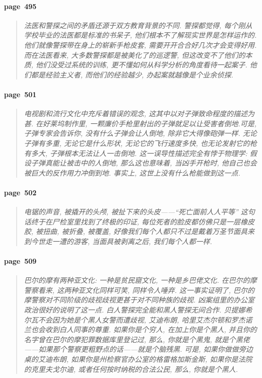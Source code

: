 \paragraph*{page~495}
\begin{quotation}
    \itshape
    法医和警探之间的矛盾还源于双方教育背景的不同. 警探都觉得, 每个刚从学校毕业的法医都是标准的书呆子, 他们根本不了解现实世界是怎样运作的. 他们就像警探带在身上的崭新手枪皮套, 需要开开合合好几次才会变得好用. 而在法医看来, 大多数警探都是被美化了的巡逻警, 但这改变不了他们的本质, 他们没受过系统的训练, 更不懂如何从科学分析的角度看待一起案子. 他们都是经验主义者, 而他们的经验越少, 办起案就越像是个业余侦探. 
\end{quotation}

\paragraph*{page~501}
\begin{quotation}
    \itshape
    电视剧和流行文化中充斥着错误的观念, 这其中以对子弹致命程度的描述为甚. 在好莱坞制作里, 一颗廉价手枪里射出的子弹就足以让受害者倒地.可是, 子弹专家会告诉你, 没有什么子弹会让人倒地, 除非它大得像砲弹一样. 无论子弹有多重, 无论它是什么形状, 无论它的飞行速度多快, 也无论发射它的枪有多大, 子弹根本无法让人一击倒地. 这一误导性描述完全有悖于物理学: 假设子弹真能让被击中的人倒地, 那么这也意味着, 当凶手开枪时, 他自己也会被巨大的反作用力冲倒到地. 事实上, 这世上没有什么枪能做到这一点. 
\end{quotation}

\paragraph*{page~502}
\begin{quotation}
    \itshape
    电锯的声音, 被撬开的头颅, 被扯下来的头皮------``死亡面前人人平等'' 这句话终于在尸检室里找到了终极的印证, 每位死者的脸皮都仿佛只是一层橡皮胶, 被扭曲, 被折叠, 被覆盖, 好像我们每个人都只不过是戴着万圣节面具来到今世走一遭的游客, 当面具被剥离之后, 我们每个人都一样. 
\end{quotation}

\paragraph*{page~509}
\begin{quotation}
    \itshape
    巴尔的摩有两种亚文化: 一种是贫民窟文化, 一种是乡巴佬文化. 在巴尔的摩警察看来, 这两种亚文化同样可笑, 同样令人唾弃. 这一事实证明了, 巴尔的摩警察对不同阶级的歧视歧视更甚于对不同种族的歧视. 凶案组里的办公室政治很好的说明了这一点. 白人警探完全能和黑人警探无间合作. 贝提娜希尔瓦不会因为她是个黑人女警而遭歧视, 艾迪布朗, 哈里艾杰尔顿和罗杰诺兰也会收到白人同事的尊重. 如果你是个穷人, 在加上你是个黑人, 并且你的名字曾在巴尔的摩犯罪数据库里登记过, 那么, 你就是个黑鬼, 就是个黑佬------如果那个警察更粗野点的话------就是个脑残黑. 可是, 如果你做做旁边桌的艾迪布朗, 如果你是州检察官办公室的格雷格加斯金斯, 如果你是法院的克里夫戈尔迪, 或者任何按时纳税的合法公民, 那么, 你就是个黑人. 
\end{quotation}

